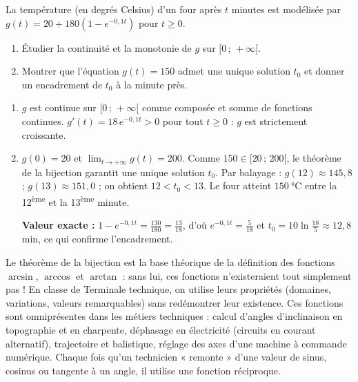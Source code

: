 \documentclass[11pt]{article}
\begin{document}
\begin{exercice}
La température (en degrés Celsius) d'un four après $t$ minutes est modélisée par $g(t) = 20 + 180\left(1 - e^{-0{,}1 t}\right)$ pour $t \geq 0$.
\begin{enumerate}
\item Étudier la continuité et la monotonie de $g$ sur $[0\,;\,+\infty[$.
\item Montrer que l'équation $g(t) = 150$ admet une unique solution $t_0$ et donner un encadrement de $t_0$ à la minute près.
\end{enumerate}
\end{exercice}

\begin{corrige}
\begin{enumerate}
\item $g$ est continue sur $[0\,;\,+\infty[$ comme composée et somme de fonctions continues. $g'(t) = 18\,e^{-0{,}1 t} > 0$ pour tout $t \geq 0$ : $g$ est strictement croissante.
\item $g(0) = 20$ et $\displaystyle\lim_{t \to +\infty} g(t) = 200$. Comme $150 \in [20\,;\,200[$, le théorème de la bijection garantit une unique solution $t_0$. Par balayage : $g(12) \approx 145{,}8$ ; $g(13) \approx 151{,}0$ ; on obtient $12 < t_0 < 13$. Le four atteint $\SI{150}{\celsius}$ entre la 12\textsuperscript{ème} et la 13\textsuperscript{ème} minute.
  \par \textbf{Valeur exacte :} $1 - e^{-0{,}1t} = \frac{130}{180} = \frac{13}{18}$, d'où $e^{-0{,}1t} = \frac{5}{18}$ et $t_0 = 10\ln\frac{18}{5} \approx 12{,}8$ min, ce qui confirme l'encadrement.
\end{enumerate}
\end{corrige}

\begin{savaistu}
Le théorème de la bijection est la base théorique de la définition des fonctions $\arcsin$, $\arccos$ et $\arctan$ : sans lui, ces fonctions n'existeraient tout simplement pas ! En classe de Terminale technique, on utilise leurs propriétés (domaines, variations, valeurs remarquables) sans redémontrer leur existence. Ces fonctions sont omniprésentes dans les métiers techniques : calcul d'angles d'inclinaison en topographie et en charpente, déphasage en électricité (circuits en courant alternatif), trajectoire et balistique, réglage des axes d'une machine à commande numérique. Chaque fois qu'un technicien « remonte » d'une valeur de sinus, cosinus ou tangente à un angle, il utilise une fonction réciproque.
\end{savaistu}
\end{document}
